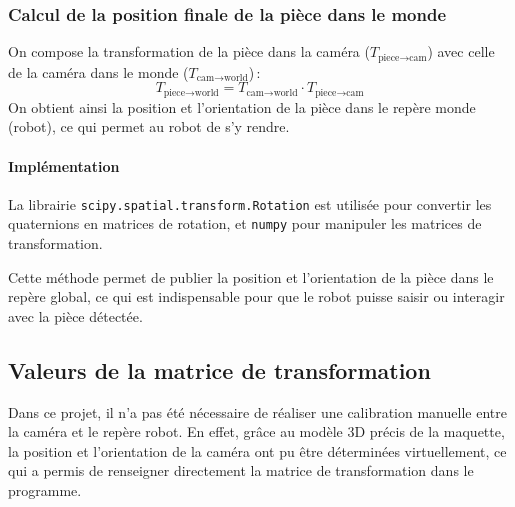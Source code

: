 \subsubsection{Calcul de la position finale de la pièce dans le monde}

On compose la transformation de la pièce dans la caméra ($T_{\text{piece} \to \text{cam}}$) avec celle de la caméra dans le monde ($T_{\text{cam} \to \text{world}}$) :
\[
    T_{\text{piece} \to \text{world}} = T_{\text{cam} \to \text{world}} \cdot T_{\text{piece} \to \text{cam}}
\]
On obtient ainsi la position et l’orientation de la pièce dans le repère monde (robot), ce qui permet au robot de s’y rendre.

\paragraph{Implémentation}
La librairie \texttt{scipy.spatial.transform.Rotation} est utilisée pour convertir les quaternions en matrices de rotation, et \texttt{numpy} pour manipuler les matrices de transformation.



Cette méthode permet de publier la position et l'orientation de la pièce dans le repère global, ce qui est indispensable pour que le robot puisse saisir ou interagir avec la pièce détectée.

\subsection{Valeurs de la matrice de transformation}

Dans ce projet, il n'a pas été nécessaire de réaliser une calibration manuelle entre la caméra et le repère robot. En effet, grâce au modèle 3D précis de la maquette, la position et l'orientation de la caméra ont pu être déterminées virtuellement, ce qui a permis de renseigner directement la matrice de transformation dans le programme.


